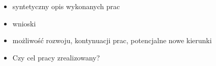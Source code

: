 \documentclass[a4paper,twoside,12pt]{book}
\begin{document}




\begin{itemize}
	\item syntetyczny opis wykonanych prac
	\item wnioski
	\item możliwość rozwoju, kontynuacji prac, potencjalne nowe kierunki
	\item Czy cel pracy zrealizowany?
\end{itemize}



\backmatter

\printbibliography           %
\end{document}
